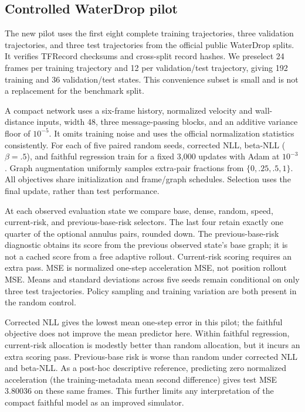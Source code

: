 \subsection{Controlled WaterDrop pilot}
The new pilot uses the first eight complete training trajectories, three validation trajectories, and three test trajectories from the official public WaterDrop splits. It verifies TFRecord checksums and cross-split record hashes. We preselect 24 frames per training trajectory and 12 per validation/test trajectory, giving 192 training and 36 validation/test states. This convenience subset is small and is not a replacement for the benchmark split.

A compact network uses a six-frame history, normalized velocity and wall-distance inputs, width 48, three message-passing blocks, and an additive variance floor of $10^{-5}$. It omits training noise and uses the official normalization statistics consistently. For each of five paired random seeds, corrected NLL, beta-NLL ($\beta=.5$), and faithful regression train for a fixed 3,000 updates with Adam at $10^{-3}$. Graph augmentation uniformly samples extra-pair fractions from $\{0,.25,.5,1\}$. All objectives share initialization and frame/graph schedules. Selection uses the final update, rather than test performance.

At each observed evaluation state we compare base, dense, random, speed, current-risk, and previous-base-risk selectors. The last four retain exactly one quarter of the optional annulus pairs, rounded down. The previous-base-risk diagnostic obtains its score from the previous observed state's base graph; it is not a cached score from a free adaptive rollout. Current-risk scoring requires an extra pass. MSE is normalized one-step acceleration MSE, not position rollout MSE. Means and standard deviations across five seeds remain conditional on only three test trajectories. Policy sampling and training variation are both present in the random control.


Corrected NLL gives the lowest mean one-step error in this pilot; the faithful objective does not improve the mean predictor here. Within faithful regression, current-risk allocation is modestly better than random allocation, but it incurs an extra scoring pass. Previous-base risk is worse than random under corrected NLL and beta-NLL. As a post-hoc descriptive reference, predicting zero normalized acceleration (the training-metadata mean second difference) gives test MSE 3.80036 on these same frames. This further limits any interpretation of the compact faithful model as an improved simulator.

